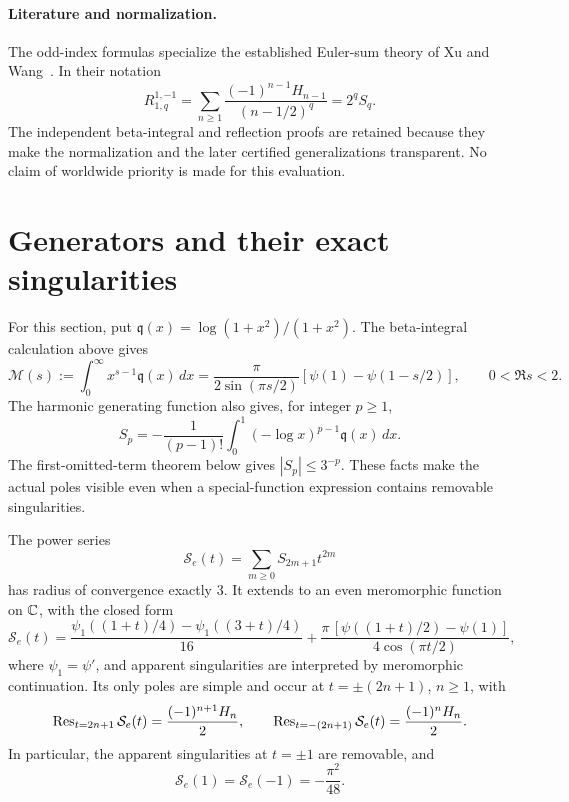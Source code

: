 \paragraph{Literature and normalization.}
The odd-index formulas specialize the established Euler-sum theory of
Xu and Wang~\cite{XuWang2023}. In their notation
\[
R_{1,q}^{1,-1}=\sum_{n\ge1}
 \frac{(-1)^{n-1}H_{n-1}}{(n-1/2)^q}=2^qS_q.
\]
The independent beta-integral and reflection proofs are retained because
they make the normalization and the later certified generalizations
transparent. No claim of worldwide priority is made for this evaluation.

\section{Generators and their exact singularities}

For this section, put $\mathfrak q(x)=\log(1+x^2)/(1+x^2)$.
The beta-integral calculation above gives
\begin{equation}\label{egen:eq:euler-full-mellin}
\mathcal M(s):=\int_0^\infty x^{s-1}\mathfrak q(x)\,dx
=\frac{\pi}{2\sin(\pi s/2)}\left[\psi(1)-\psi(1-s/2)\right],
\qquad 0<\Re s<2.
\end{equation}
The harmonic generating function also gives, for integer $p\ge1$,
\begin{equation}\label{egen:eq:euler-mellin}
S_p=-\frac1{(p-1)!}\int_0^1(-\log x)^{p-1}\mathfrak q(x)\,dx.
\end{equation}
The first-omitted-term theorem below gives $|S_p|\le3^{-p}$.
These facts make the actual poles visible even when a special-function
expression contains removable singularities.

\begin{theorem}\label{egen:thm:euler-generator}
The power series
\[
\mathcal S_e(t)=\sum_{m\ge0}S_{2m+1}t^{2m}
\]
has radius of convergence exactly \(3\). It extends to an even
meromorphic function on \(\mathbb C\), with the closed form
\begin{equation}
\boxed{\displaystyle
\mathcal S_e(t)=\frac{\psi_1((1+t)/4)-\psi_1((3+t)/4)}{16}
 +\frac{\pi\,[\psi((1+t)/2)-\psi(1)]}
        {4\cos(\pi t/2)},}
\label{egen:eq:euler-generator}
\end{equation}
where \(\psi_1=\psi'\), and apparent singularities are interpreted
by meromorphic continuation. Its only poles are simple and occur at
\(t=\pm(2n+1)\), \(n\ge1\), with
\begin{equation}
\operatorname{Res}_{t=2n+1}\mathcal S_e(t)=\frac{(-1)^{n+1}H_n}{2},\qquad
\operatorname{Res}_{t=-(2n+1)}\mathcal S_e(t)=\frac{(-1)^nH_n}{2}.
\label{egen:eq:euler-residues}
\end{equation}
In particular, the apparent singularities at \(t=\pm1\) are
removable, and
\begin{equation}
\mathcal S_e(1)=\mathcal S_e(-1)=-\frac{\pi^2}{48}.
\label{egen:eq:euler-removable}
\end{equation}
\end{theorem}

